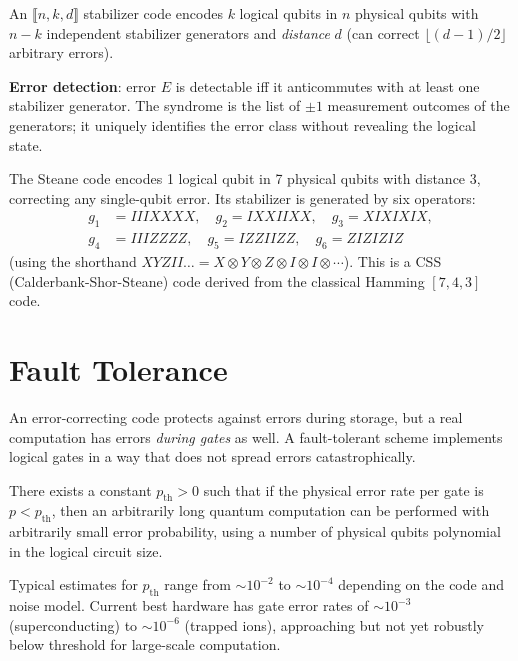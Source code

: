 \documentclass[oneside]{academica}
\begin{document}
An $\llbracket n,k,d \rrbracket$ stabilizer code encodes $k$ logical qubits in $n$ physical qubits with $n-k$ independent stabilizer generators and \emph{distance} $d$ (can correct $\lfloor(d-1)/2\rfloor$ arbitrary errors).

\textbf{Error detection}: error $E$ is detectable iff it anticommutes with at least one stabilizer generator.
The syndrome is the list of $\pm1$ measurement outcomes of the generators; it uniquely identifies the error class without revealing the logical state.

\begin{example*}
  The Steane code encodes 1 logical qubit in 7 physical qubits with distance 3, correcting any single-qubit error.
  Its stabilizer is generated by six operators:
  \begin{align*}
    g_1&=IIIXXXX,\quad g_2=IXXIIXX,\quad g_3=XIXIXIX,\\
    g_4&=IIIZZZZ,\quad g_5=IZZIIZZ,\quad g_6=ZIZIZIZ
  \end{align*}
  (using the shorthand $XYZII\ldots=X\otimes Y\otimes Z\otimes I\otimes I\otimes\cdots$).
  This is a CSS (Calderbank-Shor-Steane) code derived from the classical Hamming $[7,4,3]$ code.
\end{example*}

\section{Fault Tolerance}

An error-correcting code protects against errors during storage, but a real computation has errors \emph{during gates} as well.
A fault-tolerant scheme implements logical gates in a way that does not spread errors catastrophically.

\begin{theorem*}
  There exists a constant $p_{\mathrm{th}}>0$ such that if the physical error rate per gate is $p<p_{\mathrm{th}}$, then an arbitrarily long quantum computation can be performed with arbitrarily small error probability, using a number of physical qubits polynomial in the logical circuit size.
\end{theorem*}

Typical estimates for $p_{\mathrm{th}}$ range from $\sim10^{-2}$ to $\sim10^{-4}$ depending on the code and noise model.
Current best hardware has gate error rates of $\sim10^{-3}$ (superconducting) to $\sim10^{-6}$ (trapped ions), approaching but not yet robustly below threshold for large-scale computation.
\end{document}
